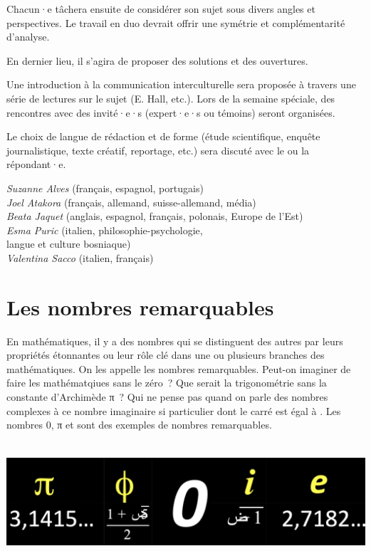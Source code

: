 \documentclass[
  10pt,
  french,
  a5paper,
  openany]{book}
\newenvironment{signature}{\begin{flushright}}{\end{flushright}}
\begin{document}
Chacun·e tâchera ensuite de considérer son sujet sous divers angles et perspectives. Le travail en duo devrait offrir une symétrie et complémentarité d'analyse.

En dernier lieu, il s'agira de proposer des solutions et des ouvertures.

Une introduction à la communication interculturelle sera proposée à travers une série de lectures sur le sujet (E. Hall, etc.). Lors de la semaine spéciale, des rencontres avec des invité·e·s (expert·e·s ou témoins) seront organisées.

Le choix de langue de rédaction et de forme (étude scientifique, enquête journalistique, texte créatif, reportage, etc.) sera discuté avec le ou la répondant·e.

\begin{signature}
\emph{Suzanne Alves} (français, espagnol, portugais)\\
\emph{Joel Atakora} (français, allemand, suisse-allemand, média)\\
\emph{Beata Jaquet} (anglais, espagnol, français, polonais, Europe de l'Est)\\
\emph{Esma Puric} (italien, philosophie-psychologie,\\
langue et culture bosniaque)\\
\emph{Valentina Sacco} (italien, français)

\end{signature}

\hypertarget{les-nombres-remarquables}{%
\chapter{Les nombres remarquables}\label{les-nombres-remarquables}}

En mathématiques, il y a des nombres qui se distinguent des autres par leurs propriétés étonnantes ou leur rôle clé dans une ou plusieurs branches des mathématiques. On les appelle les nombres remarquables.
Peut-on imaginer de faire les mathématqiues sans le zéro~? Que serait la trigonométrie sans la constante d'Archimède π~? Qui ne pense pas quand on parle des nombres complexes à ce nombre imaginaire si particulier dont le carré est égal à . Les nombres 0, π et sont des exemples de nombres remarquables.

\begin{center}
\includegraphics[width=\textwidth,height=12em]{images/les-nombres-remarquables-1.jpg}

\end{center}
\end{document}
